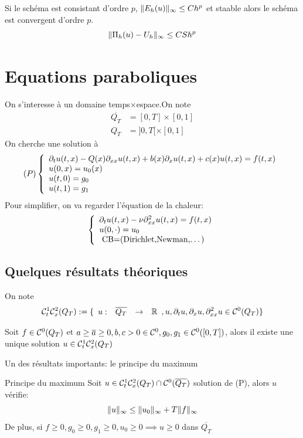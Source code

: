 \documentclass[]{report}
\begin{document}
    \begin{tm}{}{}
        Si le schéma est consistant d'ordre $p$, $\lVert E_h(u) \rVert_\infty\le Ch^p$ et staable alors le schéma est convergent d'ordre $p$.
        \[\lVert \Pi_h(u)-U_h \rVert_\infty\le CSh^p\]
    \end{tm}

    \section{Equations paraboliques}

    On s'interesse à un domaine temps$\times$espace.On note
    \begin{align*}
        \overline{Q_T}&=[0,T]\times[0,1]\\
        Q_T&=]0,T[\times [0,1]
    \end{align*}
    On cherche une solution à
    \[(P)\left\{\begin{array}{ll} \partial_t u(t,x)-Q(x)\partial_{xx}u(t,x)+b(x)\partial_x u(t,x)+c(x)u(t,x)=f(t,x)\\
    u(0,x)=u_0(x)\\
    u(t,0)=g_0\\
    u(t,1)=g_1 \end{array} \right.\]
    Pour simplifier, on va regarder l'équation de la chaleur:
    \[\left\{\begin{array}{ll} \partial_t u(t,x)-\nu \partial_{xx}^2 u(t,x)=f(t,x)\\
    u(0,\cdot)=u_0\\
    \text{ CB=(Dirichlet,Newman,\ldots)} \end{array} \right.\]

    \subsection{Quelques résultats théoriques}

    On note
    \[\mathcal{C}^1_t \mathcal{C}^{2}_x(Q_T):=\{\begin{array}{ccccc} u : & \overline{Q_T} & \to & \mathbb{R} \end{array},u,\partial_t u,\partial_x u,\partial_{xx}^2 u\in \mathcal{C}^0(Q_T)\}\]
    
    \begin{tm}{}{}
        Soit $f\in \mathcal{C}^0(Q_T)$ et $a\ge\overline{a}\ge 0,b,c>0\in\mathcal{C}^0,g_0,g_1\in \mathcal{C}^{0}([0,T])$, alors il existe une unique solution $u\in \mathcal{C}^1_t \mathcal{C}^{2}_x(Q_T)$
    \end{tm}

    Un des résultats importants: le principe du maximum

    \begin{tm}{Principe du maximum}{}
        Soit $u\in\mathcal{C}^1_t \mathcal{C}^{2}_x(Q_T)\cap \mathcal{C}^{0}(\overline{Q_T})$ solution de (P), alors $u$ vérifie:
        \[\lVert u \rVert_\infty\le\lVert u_0 \rVert_\infty+T\lVert f \rVert_\infty\]
        De plus, si $f\ge 0,g_0\ge 0,g_1\ge 0,u_0\ge 0\implies u\ge 0$ dans $\overline{Q_T}$
    \end{tm}
\end{document}

